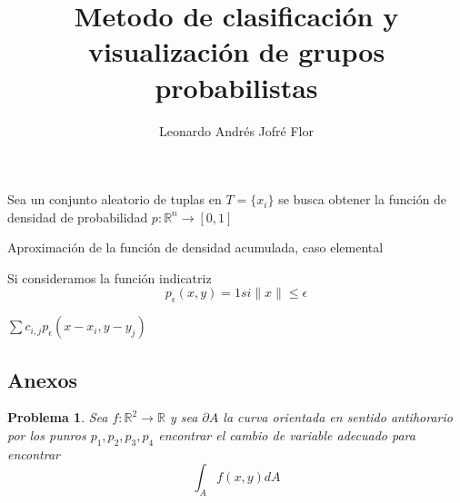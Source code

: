 \documentclass{article}
\author{Leonardo Andrés Jofré Flor}
\title{Metodo de clasificación y visualización de grupos probabilistas}
\newtheorem{problema}{Problema}
\begin{document}
Sea un conjunto aleatorio de tuplas en $T=\{x_i\}$ se busca obtener la función
de densidad de probabilidad $p:\mathbb{R}^n\to[0,1]$

Aproximación de la función de densidad acumulada, caso elemental






Si consideramos la función indicatriz
$$p_\epsilon(x,y)=1 si \|x\|\le \epsilon$$

$\sum c_{i,j}p_\epsilon(x-x_i,y-y_j)$






\subsection{Anexos}

\begin{problema}
	Sea $f:\mathbb{R}^2\to\mathbb{R}$ y sea $\partial A$ la curva orientada en
	sentido antihorario por los punros $p_1,p_2,p_3,p_4$ encontrar el cambio de
	variable adecuado para encontrar
	$$\int_A f(x,y)dA$$
\end{problema}
\end{document}
